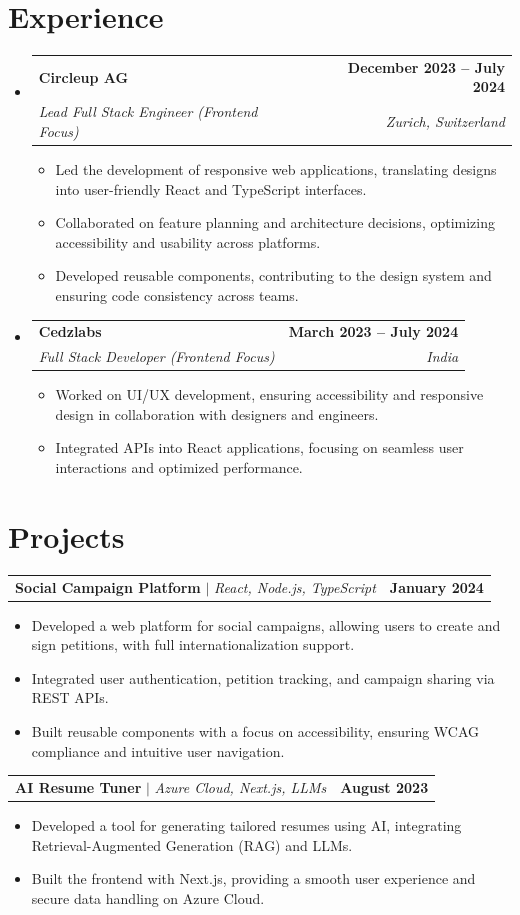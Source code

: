 \documentclass[letterpaper,11pt]{article}
\makeatletter
\newcommand{\resumeSubheading}[4]{
  \vspace{-2pt}\item
    \begin{tabular*}{1.0\textwidth}[t]{l@{\extracolsep{\fill}}r}
      \textbf{#1} & \textbf{\small #2} \\
      \textit{\small#3} & \textit{\small #4} \\
    \end{tabular*}\vspace{-7pt}
}
\newcommand{\resumeProjectHeading}[2]{
    \item
    \begin{tabular*}{1.001\textwidth}{l@{\extracolsep{\fill}}r}
      \small#1 & \textbf{\small #2}\\
    \end{tabular*}\vspace{-7pt}
}
\newcommand{\resumeSubHeadingListStart}{\begin{itemize}[leftmargin=0.0in, label={}]}
\newcommand{\resumeSubHeadingListEnd}{\end{itemize}}
\makeatother
\begin{document}
\section{Experience}
\resumeSubHeadingListStart
\resumeSubheading
{\large Circleup AG}{December 2023 -- July 2024}
  {Lead Full Stack Engineer (Frontend Focus)}{Zurich, Switzerland}
\begin{itemize}
    \item Led the development of responsive web applications, translating designs into user-friendly React and TypeScript interfaces.
    \item Collaborated on feature planning and architecture decisions, optimizing accessibility and usability across platforms.
    \item Developed reusable components, contributing to the design system and ensuring code consistency across teams.
\end{itemize}

\resumeSubheading
{Cedzlabs}{March 2023 -- July 2024}
{Full Stack Developer (Frontend Focus)}{India}
\begin{itemize}
    \item Worked on UI/UX development, ensuring accessibility and responsive design in collaboration with designers and engineers.
    \item Integrated APIs into React applications, focusing on seamless user interactions and optimized performance.
\end{itemize}

\resumeSubHeadingListEnd

\section{Projects}
\resumeProjectHeading
{\textbf{Social Campaign Platform} $|$ \emph{React, Node.js, TypeScript}}{January 2024}
\begin{itemize}
    \item Developed a web platform for social campaigns, allowing users to create and sign petitions, with full internationalization support.
    \item Integrated user authentication, petition tracking, and campaign sharing via REST APIs.
    \item Built reusable components with a focus on accessibility, ensuring WCAG compliance and intuitive user navigation.
\end{itemize}

\resumeProjectHeading
{\textbf{AI Resume Tuner} $|$ \emph{Azure Cloud, Next.js, LLMs}}{August 2023}
\begin{itemize}
    \item Developed a tool for generating tailored resumes using AI, integrating Retrieval-Augmented Generation (RAG) and LLMs.
    \item Built the frontend with Next.js, providing a smooth user experience and secure data handling on Azure Cloud.
\end{itemize}
\end{document}
